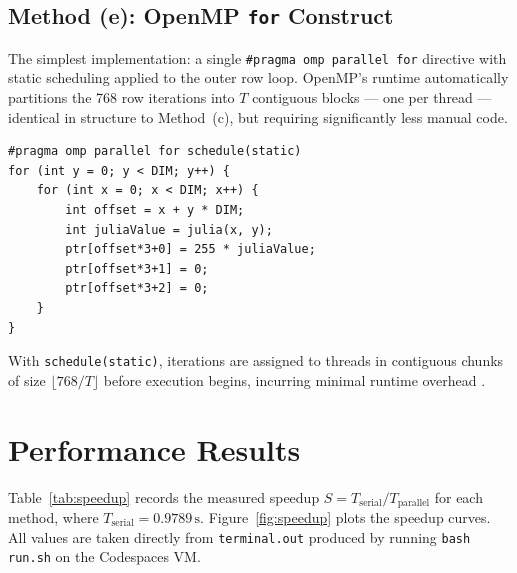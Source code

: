 \subsection{Method (e): OpenMP \texttt{for} Construct}

The simplest implementation: a single \texttt{\#pragma omp parallel for} directive with
static scheduling applied to the outer row loop.
OpenMP's runtime automatically partitions the 768 row iterations into $T$ contiguous
blocks — one per thread — identical in structure to Method~(c), but requiring
significantly less manual code.

\begin{lstlisting}[caption={OpenMP \texttt{for}-construct kernel},label={lst:ompfor}]
#pragma omp parallel for schedule(static)
for (int y = 0; y < DIM; y++) {
    for (int x = 0; x < DIM; x++) {
        int offset = x + y * DIM;
        int juliaValue = julia(x, y);
        ptr[offset*3+0] = 255 * juliaValue;
        ptr[offset*3+1] = 0;
        ptr[offset*3+2] = 0;
    }
}
\end{lstlisting}

With \texttt{schedule(static)}, iterations are assigned to threads in contiguous
chunks of size $\lfloor 768/T \rfloor$ before execution begins, incurring minimal
runtime overhead \citep{chapman2007using}.

\section{Performance Results}

Table~\ref{tab:speedup} records the measured speedup
$S = T_{\text{serial}} / T_{\text{parallel}}$ for each method, where
$T_{\text{serial}} = 0.9789\,\text{s}$.
Figure~\ref{fig:speedup} plots the speedup curves.
All values are taken directly from \texttt{terminal.out} produced by running
\texttt{bash run.sh} on the Codespaces VM.

